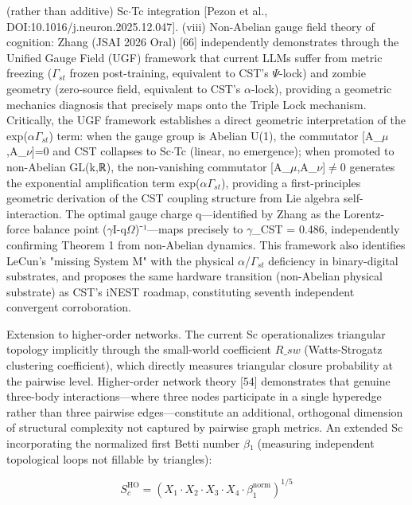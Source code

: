 \documentclass[a4paper,12pt]{article}
\begin{document}
(rather than additive) Sc$\cdot$Tc integration [Pezon et al., DOI:10.1016/j.neuron.2025.12.047]. (viii) Non-Abelian gauge field theory of cognition: Zhang (JSAI 2026 Oral) [66] independently demonstrates through the Unified Gauge Field (UGF) framework that current LLMs suffer from metric freezing ($\Gamma_{st}$ frozen post-training, equivalent to CST's $\Psi$-lock) and zombie geometry (zero-source field, equivalent to CST's $\alpha$-lock), providing a geometric mechanics diagnosis that precisely maps onto the Triple Lock mechanism. Critically, the UGF framework establishes a direct geometric interpretation of the exp($\alpha$\cdot$\Gamma_{st}$) term: when the gauge group is Abelian U(1), the commutator [A_$\mu$,A_$\nu$]=0 and CST collapses to Sc$\cdot$Tc (linear, no emergence); when promoted to non-Abelian GL(k,ℝ), the non-vanishing commutator [A_$\mu$,A_$\nu$]$\neq$0 generates the exponential amplification term exp($\alpha$\cdot$\Gamma_{st}$), providing a first-principles geometric derivation of the CST coupling structure from Lie algebra self-interaction. The optimal gauge charge q---identified by Zhang as the Lorentz-force balance point ($\gamma$I-q$\Omega$)⁻¹---maps precisely to $\gamma$_CST = 0.486, independently confirming Theorem 1 from non-Abelian dynamics. This framework also identifies LeCun's "missing System M" with the physical $\alpha$/$\Gamma_{st}$ deficiency in binary-digital substrates, and proposes the same hardware transition (non-Abelian physical substrate) as CST's iNEST roadmap, constituting seventh independent convergent corroboration.


Extension to higher-order networks. The current Sc operationalizes triangular topology implicitly through the small-world coefficient $R\_{sw}$ (Watts-Strogatz clustering coefficient), which directly measures triangular closure probability at the pairwise level. Higher-order network theory [54] demonstrates that genuine three-body interactions---where three nodes participate in a single hyperedge rather than three pairwise edges---constitute an additional, orthogonal dimension of structural complexity not captured by pairwise graph metrics. An extended Sc incorporating the normalized first Betti number $\beta$₁ (measuring independent topological loops not fillable by triangles):


\begin{equation}

S_c^{\text{HO}} = (X_1 \cdot X_2 \cdot X_3 \cdot X_4 \cdot \beta_1^{\text{norm}})^{1/5}

\end{equation}
\end{document}
